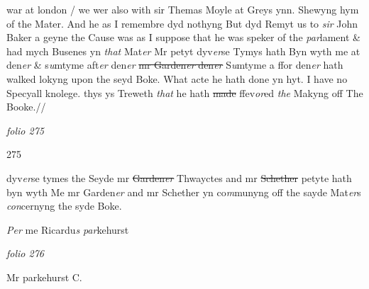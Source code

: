 \documentclass[12pt, a4paper]{book}
\begin{document}
war at london / we wer also with sir Themas Moyle at Greys ynn. 
Shewyng hym of the Mater. And he as I remembre dyd nothyng But dyd
Remyt us to \textit{sir} John Baker a geyne the Cause was as I suppose that he
was speker of the \textit{par}lament \& had mych Busenes yn \textit{that} Mat\textit{er}
Mr petyt dyv\textit{er}se Tymys hath Byn wyth me at den\textit{er} \& s\textit{u}mtyme aft\textit{er} den\textit{er}
 	\sout{mr Garden\textit{er} den\textit{er}
               }
               \textit{} S\textit{u}mtyme a ffor den\textit{er} hath walked lokyng upon the
seyd Boke. What acte he hath done yn hyt. I have no Specyall
knolege. thys ys Treweth \textit{that} he hath \sout{made }ffev\textit{or}ed \textit{the} Makyng off 
The Booke.//















\dotfill
						\newpage
{}

\textit{folio 275}


 	\begin{flushright}{\color{Mahogany}275}\end{flushright}

 	
		\ifthenelse{\isodd{\thepage}}
		{\reversemarginpar}
		{\normalmarginpar}
		dyv\textit{er}se tymes the Seyde mr \sout{Garden\textit{er}
               }
 		Thwayctes 
			and mr \sout{Schether }
               petyte 
			hath byn wyth
Me mr Garden\textit{er} and mr Schether yn co\textit{m}munyng off the sayde
Mat\textit{er}s \textit{con}cernyng the syde Boke.


		\ifthenelse{\isodd{\thepage}}
		{\reversemarginpar}
		{\normalmarginpar}
		\textit{Per} me Ricardu\textit{s}
               \textit{par}kehurst

\dotfill
						\newpage
{}

\textit{folio 276}



		\ifthenelse{\isodd{\thepage}}
		{\reversemarginpar}
		{\normalmarginpar}
		Mr parkehurst C.
			

\dotfill
						\newpage {} \section*{}  \subsection*{}
\end{document}
